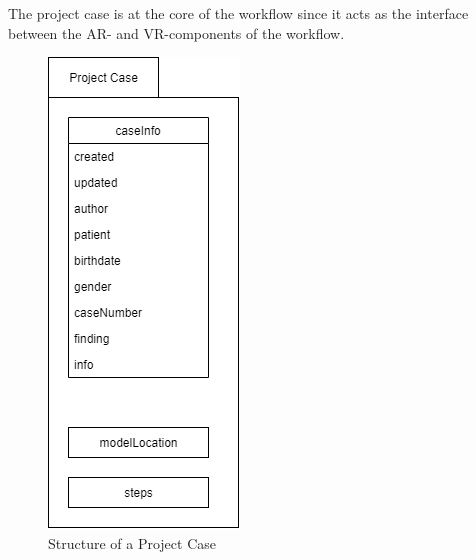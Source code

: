 The project case is at the core of the workflow since it acts as the interface between the AR- and VR-components of the workflow.

\begin{figure}[ht!]
    \centering
    \includegraphics[width=\linewidth]{images/implementation/project_case.png}
    \caption{\label{fig::ImplementationProjectCase}Structure of a Project Case}
\end{figure}

